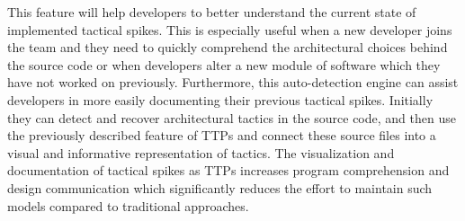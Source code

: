 This feature will help developers to better understand the current state of implemented tactical spikes. This is especially useful when a new developer joins the team and they need to quickly comprehend the architectural choices behind the source code or when developers alter a new module of software which they have not worked on previously. Furthermore, this auto-detection engine can assist developers in more easily documenting their previous tactical spikes. Initially they can detect and recover architectural tactics in the source code, and then use the previously described feature of TTPs and connect these source files into a visual and informative representation of tactics. The visualization and documentation of tactical spikes as TTPs increases program comprehension and design communication which significantly reduces the effort to maintain such models compared to traditional approaches.